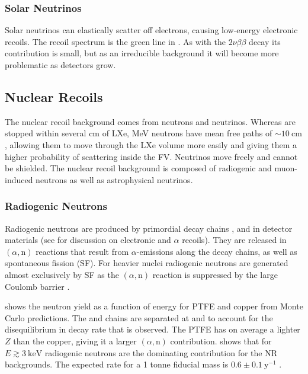 \subsubsection{Solar Neutrinos}
\label{subsubsec:backgrounds_electronic_solar_neutrinos}
Solar neutrinos can elastically scatter off electrons, causing low-energy electronic recoils.  The recoil spectrum is the green line in
.  As with the  $2 \nu \beta \beta$
decay its contribution is small, but as an irreducible background it will become more problematic as detectors grow.



\subsection{Nuclear Recoils}
\label{subsec:backgrounds_nuclear}
The nuclear recoil background comes from neutrons and neutrinos.  Whereas \gammarays are stopped within several cm of LXe, MeV
neutrons have mean free paths of ${\sim}10\ \mathrm{cm}$, allowing them to move through the LXe volume more easily and giving them a
higher
probability of scattering inside the FV.  Neutrinos move freely and cannot be shielded.  The nuclear recoil background is composed of
radiogenic and muon-induced neutrons as well as astrophysical neutrinos.



\subsubsection{Radiogenic Neutrons}
\label{subsubsec:backgrounds_nuclear_radiogenic}
Radiogenic neutrons are produced by primordial decay chains ,  and  in detector materials
(see  for discussion on electronic and $\alpha$ recoils).  They are released in
$(\alpha, \mathrm{n})$ reactions that result from $\alpha$-emissions along the decay chains, as well as spontaneous fission (SF).  For
heavier nuclei radiogenic neutrons are generated almost exclusively by SF as the $(\alpha, \mathrm{n})$ reaction is suppressed by the
large Coulomb barrier .

 shows the neutron yield as a function of energy for PTFE and copper from Monte Carlo
predictions.  The  and  chains are
separated at  and  to account for the disequilibrium in decay rate
that is observed.  The PTFE has on average a lighter $Z$ than the copper, giving it a larger $(\alpha, \mathrm{n})$
contribution.   shows that for $E \gtrsim 3\ \mathrm{keV}$
radiogenic neutrons are the dominating contribution for the NR backgrounds.  The expected rate for a 1 tonne fiducial mass is
$0.6 \pm 0.1\ \mathrm{y^{-1}}$ .

